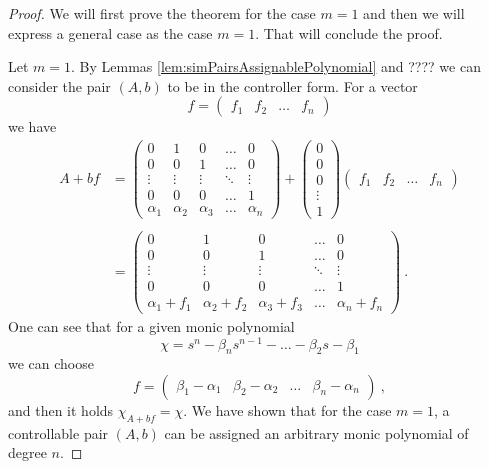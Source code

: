 \begin{proof}
    We will first prove the theorem for the case $m=1$ and then we will express a general case as the case $m=1$. That will conclude the proof.

    Let $m=1$. By Lemmas \ref{lem:simPairsAssignablePolynomial} and ???? we can consider the pair $(A,b)$ to be in the controller form. For a vector 
    \begin{equation*}
        f=\begin{pmatrix}
            f_1&f_2&\ldots&f_n
        \end{pmatrix}
    \end{equation*}
    we have 
    \begin{align*}
        A+bf&=
        \begin{pmatrix}
			0 & 1 & 0 & \ldots & 0 \\
			0 & 0 & 1 & \ldots & 0 \\
			\vdots & \vdots & \vdots & \ddots & \vdots \\
			0 & 0 & 0 & \ldots & 1 \\
			\alpha_1 & \alpha_2 & \alpha_3 & \ldots & \alpha_n
        \end{pmatrix}
        +
        \begin{pmatrix}
            0 \\
            0 \\
            0 \\
            \vdots \\
            1
        \end{pmatrix}
        \begin{pmatrix}
            f_1&f_2&\ldots&f_n
        \end{pmatrix}
        \\
        \\
        &=
        \begin{pmatrix}
			0 & 1 & 0 & \ldots & 0 \\
			0 & 0 & 1 & \ldots & 0 \\
			\vdots & \vdots & \vdots & \ddots & \vdots \\
			0 & 0 & 0 & \ldots & 1 \\
            \alpha_1+f_1 & \alpha_2+f_2 & \alpha_3+f_3 & \ldots & \alpha_n+f_n
        \end{pmatrix}\ .
    \end{align*}
    One can see that for a given monic polynomial
    $$\chi=s^n-\beta_ns^{n-1}-\ldots-\beta_2s-\beta_1$$
    we can choose
    $$f=\begin{pmatrix}
        \beta_1-\alpha_1&\beta_2-\alpha_2&\ldots&\beta_n-\alpha_n
    \end{pmatrix}\ ,$$
    and then it holds $\chi_{A+bf}=\chi$. We have shown that for the case $m=1$, a controllable pair $(A,b)$ can be assigned an arbitrary monic polynomial of degree $n$.


\end{proof}
